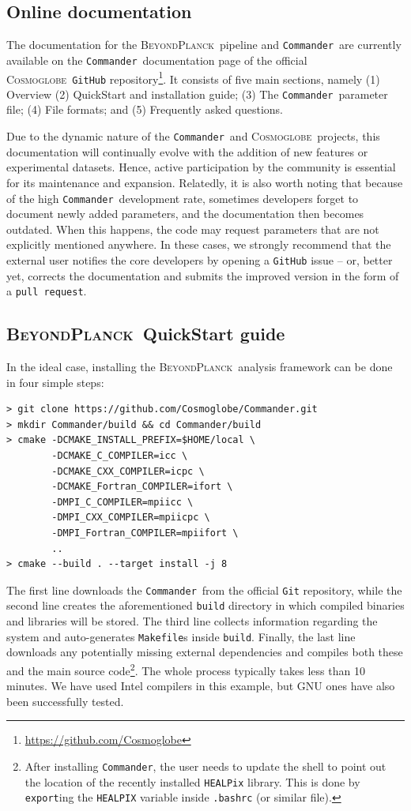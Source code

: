 \documentclass[twocolumn]{aa}
\def\commander{\texttt{Commander}}
\newcommand{\BP}{\textsc{BeyondPlanck}}
\newcommand{\cosmoglobe}{\textsc{Cosmoglobe}}
\begin{document}
\subsection{Online documentation}
\label{sec:docs}

The documentation for the \BP\ pipeline and \commander\ are currently available on the \commander\ documentation page of the official \cosmoglobe\ \texttt{GitHub} repository\footnote{\url{https://github.com/Cosmoglobe}}. It consists of five main sections, namely (1) Overview (2) QuickStart and installation guide; (3) The \commander\ parameter file; (4) File formats; and (5) Frequently asked questions.

Due to the dynamic nature of the \commander\ and \cosmoglobe\ projects, this documentation will continually evolve with the addition of new features or experimental datasets. Hence, active participation by the community is essential for its maintenance and expansion. Relatedly, it is also worth noting that because of the high \commander\ development rate, sometimes developers forget to document newly added parameters, and the documentation then becomes outdated. When this happens, the code may request parameters that are not explicitly mentioned anywhere. In these cases, we strongly recommend that the external user notifies the core developers by opening a \texttt{GitHub} issue -- or, better yet, corrects the documentation and submits the improved version in the form of a \texttt{pull request}.

\subsection{\BP\ QuickStart guide}
\label{sec:quickstart}

In the ideal case, installing the \BP\ analysis framework can be done
in four simple steps:
{\small
\begin{verbatim}
> git clone https://github.com/Cosmoglobe/Commander.git 
> mkdir Commander/build && cd Commander/build
> cmake -DCMAKE_INSTALL_PREFIX=$HOME/local \
        -DCMAKE_C_COMPILER=icc \
        -DCMAKE_CXX_COMPILER=icpc \
        -DCMAKE_Fortran_COMPILER=ifort \
        -DMPI_C_COMPILER=mpiicc \
        -DMPI_CXX_COMPILER=mpiicpc \
        -DMPI_Fortran_COMPILER=mpiifort \
        ..
> cmake --build . --target install -j 8
\end{verbatim}}
\noindent The first line downloads the \commander\ from the official \texttt{Git} repository, while the second line creates the aforementioned \texttt{build} directory in which compiled binaries and libraries will be stored. The third line collects information regarding the system and auto-generates \texttt{Makefile}s inside \texttt{build}. Finally, the last line downloads any potentially missing external dependencies and compiles both these and the main source code\footnote{After installing \commander, the user needs to update the shell to point out the location of the recently installed \texttt{HEALPix} library. This is done by \texttt{export}ing the \texttt{HEALPIX} variable inside \texttt{.bashrc} (or similar file).}. The whole process typically takes less than 10 minutes. We have used Intel compilers in this example, but GNU ones have also been successfully tested.
\end{document}

